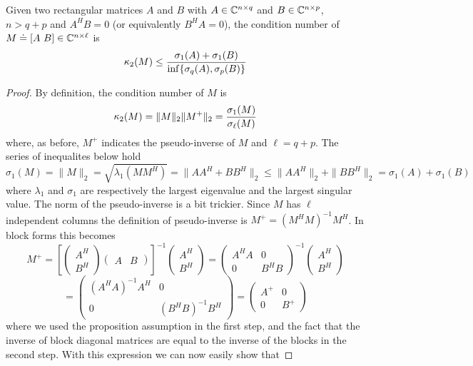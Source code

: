 \begin{theorem}
\label{th:deflation}
Given two rectangular matrices $A$ and $B$ with $A \in \mathbb{C}^{n\times q}$ and $B \in \mathbb{C}^{n\times p}$, $n>q+p$ and $A^HB=0$ (or equivalently $B^HA=0$), the condition number of $M \doteq \left[A\ B\right] \in \C^{n\times\ell}$ is
\begin{equation}
    \mathop\mathrm{\kappa}_2\nolimits (M) \leq \frac{\sigma_1(A) + \sigma_1(B)}{\inf\{\sigma_q(A), \sigma_p(B)\}}
\end{equation}
\end{theorem}
\begin{proof}
By definition, the condition number of $M$ is
\begin{equation*}
    \mathop\mathrm{\kappa}_2\nolimits (M) = \|M\|_2 \|M^+\|_2 = \frac{\sigma_1(M)}{\sigma_\ell(M)}
\end{equation*}
where, as before, $M^+$ indicates the pseudo-inverse of $M$ and $\ell = q+p$. The series of inequalites below hold
\[
\sigma_1(M) = \|M\|_2 = \sqrt{\lambda_1(MM^H)} = \|AA^H + BB^H\|_2 \leq \|AA^H\|_2 + \|BB^H\|_2 = \sigma_1(A) + \sigma_1(B) 
\]
where $\lambda_1$ and $\sigma_1$ are respectively the largest eigenvalue and the largest singular value. The norm of the pseudo-inverse is a bit trickier. Since $M$ has $\ell$ independent columns the definition of pseudo-inverse is $M^+ = (M^HM)^{-1}M^H$. In block forms this becomes
\[
M^+ = \left[ \begin{pmatrix} A^H \\ B^H \end{pmatrix} \begin{pmatrix} A & B \end{pmatrix} \right]^{-1} \begin{pmatrix} A^H \\ B^H \end{pmatrix} = \begin{pmatrix} A^HA & 0 \\ 0 & B^HB \end{pmatrix}^{-1} \begin{pmatrix} A^H \\ B^H \end{pmatrix}
\]
\[
= \begin{pmatrix} (A^HA)^{-1}A^H & 0 \\ 0 & (B^HB)^{-1}B^H \end{pmatrix} 
 =  \begin{pmatrix} A^+ & 0 \\ 0 & B^+ \end{pmatrix}
\]
where we used the proposition assumption in the first step, and the fact that the inverse of block diagonal matrices are equal to the inverse of the blocks in the second step. With this expression we can now easily show that

\end{proof}
